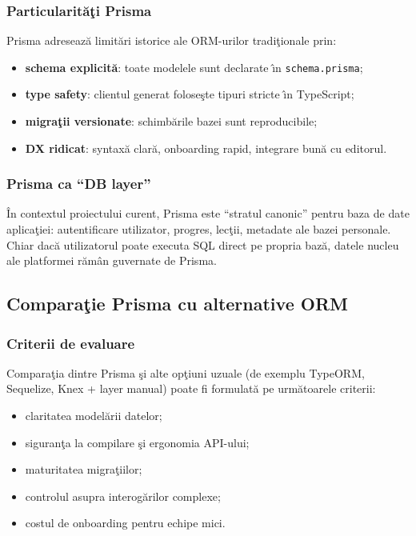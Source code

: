 \documentclass[12pt,onecolumn,draftclsnofoot]{IEEEtran}
\begin{document}
\subsubsection{Particularit\u{a}\c{t}i Prisma}
Prisma adreseaz\u{a} limit\u{a}ri istorice ale ORM-urilor tradi\c{t}ionale prin:
\begin{itemize}
  \item \textbf{schema explicit\u{a}}: toate modelele sunt declarate \^{\i}n \texttt{schema.prisma};
  \item \textbf{type safety}: clientul generat folose\c{s}te tipuri stricte \^{\i}n TypeScript;
  \item \textbf{migra\c{t}ii versionate}: schimb\u{a}rile bazei sunt reproducibile;
  \item \textbf{DX ridicat}: syntax\u{a} clar\u{a}, onboarding rapid, integrare bun\u{a} cu editorul.
\end{itemize}

\subsubsection{Prisma ca \enquote{DB layer}}
\^{I}n contextul proiectului curent, Prisma este \enquote{stratul canonic} pentru baza de date aplica\c{t}iei: autentificare utilizator, progres, lec\c{t}ii, metadate ale bazei personale. Chiar dac\u{a} utilizatorul poate executa SQL direct pe propria baz\u{a}, datele nucleu ale platformei r\u{a}m\^{a}n guvernate de Prisma.

\subsection{Compara\c{t}ie Prisma cu alternative ORM}
\subsubsection{Criterii de evaluare}
Compara\c{t}ia dintre Prisma \c{s}i alte op\c{t}iuni uzuale (de exemplu TypeORM, Sequelize, Knex + layer manual) poate fi formulat\u{a} pe urm\u{a}toarele criterii:
\begin{itemize}
  \item claritatea model\u{a}rii datelor;
  \item siguran\c{t}a la compilare \c{s}i ergonomia API-ului;
  \item maturitatea migra\c{t}iilor;
  \item controlul asupra interog\u{a}rilor complexe;
  \item costul de onboarding pentru echipe mici.
\end{itemize}
\end{document}
